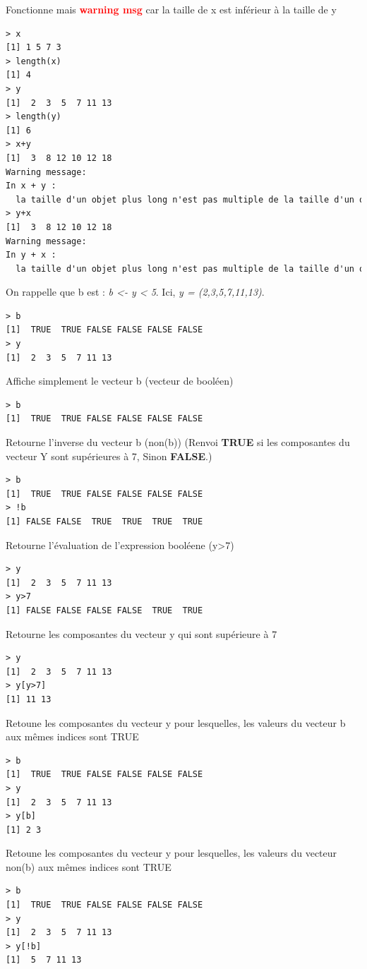 Fonctionne mais \textbf{\textcolor{red}{warning msg}} car la taille de x est inférieur à la taille de y
\begin{lstlisting}[language=html]
> x
[1] 1 5 7 3
> length(x)
[1] 4
> y
[1]  2  3  5  7 11 13
> length(y)
[1] 6
> x+y
[1]  3  8 12 10 12 18
Warning message:
In x + y :
  la taille d'un objet plus long n'est pas multiple de la taille d'un objet plus court
> y+x
[1]  3  8 12 10 12 18
Warning message:
In y + x :
  la taille d'un objet plus long n'est pas multiple de la taille d'un objet plus court
\end{lstlisting}
On rappelle que b est : \textit{b <- y < 5}. Ici, \textit{y = (2,3,5,7,11,13)}.
\begin{lstlisting}[language=html]
> b
[1]  TRUE  TRUE FALSE FALSE FALSE FALSE
> y
[1]  2  3  5  7 11 13
\end{lstlisting}
Affiche simplement le vecteur b (vecteur de booléen)
\begin{lstlisting}[language=html]
> b
[1]  TRUE  TRUE FALSE FALSE FALSE FALSE
\end{lstlisting}
Retourne l'inverse du vecteur b (non(b)) (Renvoi \textbf{TRUE} si les composantes du vecteur Y sont supérieures à 7, Sinon \textbf{FALSE}.)
\begin{lstlisting}[language=html]
> b
[1]  TRUE  TRUE FALSE FALSE FALSE FALSE
> !b
[1] FALSE FALSE  TRUE  TRUE  TRUE  TRUE
\end{lstlisting}
Retourne l'évaluation de l'expression booléene (y>7)
\begin{lstlisting}[language=html]
> y
[1]  2  3  5  7 11 13
> y>7
[1] FALSE FALSE FALSE FALSE  TRUE  TRUE
\end{lstlisting}
Retourne les composantes du vecteur y qui sont supérieure à 7
\begin{lstlisting}[language=html]
> y
[1]  2  3  5  7 11 13
> y[y>7]
[1] 11 13
\end{lstlisting}
Retoune les composantes du vecteur y pour lesquelles, les valeurs du vecteur b aux mêmes indices sont TRUE
\begin{lstlisting}[language=html]
> b
[1]  TRUE  TRUE FALSE FALSE FALSE FALSE
> y
[1]  2  3  5  7 11 13
> y[b]
[1] 2 3
\end{lstlisting}
Retoune les composantes du vecteur y pour lesquelles, les valeurs du vecteur non(b) aux mêmes indices sont TRUE
\begin{lstlisting}[language=html]
> b
[1]  TRUE  TRUE FALSE FALSE FALSE FALSE
> y
[1]  2  3  5  7 11 13
> y[!b]
[1]  5  7 11 13
\end{lstlisting}

